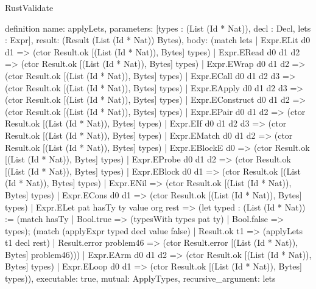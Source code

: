 \begin{lexlean}{RustValidate}
\begin{semanticmodule}
definition{
  name: applyLets,
  parameters: [types : (List (Id * Nat)), decl : Decl, lets : Expr],
  result: (Result (List (Id * Nat)) Bytes),
  body: (match lets
    | Expr.ELit d0 d1 => (ctor Result.ok [(List (Id * Nat)), Bytes] types)
    | Expr.ERead d0 d1 d2 => (ctor Result.ok [(List (Id * Nat)), Bytes] types)
    | Expr.EWrap d0 d1 d2 => (ctor Result.ok [(List (Id * Nat)), Bytes] types)
    | Expr.ECall d0 d1 d2 d3 => (ctor Result.ok [(List (Id * Nat)), Bytes] types)
    | Expr.EApply d0 d1 d2 d3 => (ctor Result.ok [(List (Id * Nat)), Bytes] types)
    | Expr.EConstruct d0 d1 d2 => (ctor Result.ok [(List (Id * Nat)), Bytes] types)
    | Expr.EPair d0 d1 d2 => (ctor Result.ok [(List (Id * Nat)), Bytes] types)
    | Expr.EIf d0 d1 d2 d3 => (ctor Result.ok [(List (Id * Nat)), Bytes] types)
    | Expr.EMatch d0 d1 d2 => (ctor Result.ok [(List (Id * Nat)), Bytes] types)
    | Expr.EBlockE d0 => (ctor Result.ok [(List (Id * Nat)), Bytes] types)
    | Expr.EProbe d0 d1 d2 => (ctor Result.ok [(List (Id * Nat)), Bytes] types)
    | Expr.EBlock d0 d1 => (ctor Result.ok [(List (Id * Nat)), Bytes] types)
    | Expr.ENil => (ctor Result.ok [(List (Id * Nat)), Bytes] types)
    | Expr.ECons d0 d1 => (ctor Result.ok [(List (Id * Nat)), Bytes] types)
    | Expr.ELet pat hasTy ty value org rest => (let typed : (List (Id * Nat)) := (match hasTy
      | Bool.true => (typesWith types pat ty)
      | Bool.false => types); (match (applyExpr typed decl value false)
      | Result.ok t1 => (applyLets t1 decl rest)
      | Result.error problem46 => (ctor Result.error [(List (Id * Nat)), Bytes] problem46)))
    | Expr.EArm d0 d1 d2 => (ctor Result.ok [(List (Id * Nat)), Bytes] types)
    | Expr.ELoop d0 d1 => (ctor Result.ok [(List (Id * Nat)), Bytes] types)),
  executable: true,
  mutual: ApplyTypes,
  recursive_argument: lets
}


\end{semanticmodule}
\end{lexlean}
